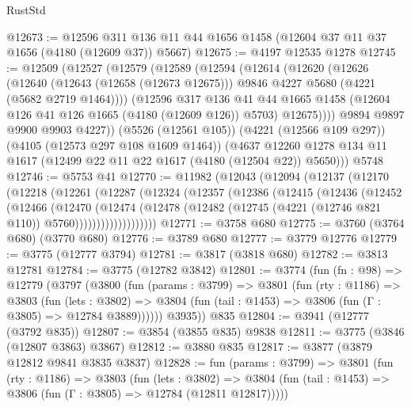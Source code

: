 \begin{lexlean}{RustStd}
\begin{coremodule}
@12673 := @12596 @311 @136 @11 @44 @1656 @1458 (@12604 @37 @11 @37 @1656 (@4180 (@12609 @37)) @5667)
@12675 := @4197 @12535 @1278
@12745 := @12509
    (@12527
      (@12579
        (@12589
          (@12594
            (@12614
              (@12620
                (@12626
                  (@12640
                    (@12643 (@12658 (@12673 @12675)))
                    @9846
                    @4227
                    @5680
                    (@4221 (@5682 @2719 @1464))))
                (@12596
                  @317
                  @136
                  @41
                  @44
                  @1665
                  @1458
                  (@12604 @126 @41 @126 @1665 (@4180 (@12609 @126)) @5703)
                  @12675))))
          @9894
          @9897
          @9900
          @9903
          @4227))
      (@5526 (@12561 @105))
      (@4221 (@12566 @109 @297))
      (@4105 (@12573 @297 @108 @1609 @1464))
      (@4637 @12260 @1278 @134 @11 @1617 (@12499 @22 @11 @22 @1617 (@4180 (@12504 @22)) @5650)))
    @5748
@12746 := @5753 @41
@12770 := @11982
    (@12043
      (@12094
        (@12137
          (@12170
            (@12218
              (@12261
                (@12287
                  (@12324
                    (@12357
                      (@12386
                        (@12415
                          (@12436
                            (@12452
                              (@12466
                                (@12470
                                  (@12474
                                    (@12478
                                      (@12482
                                        (@12745 (@4221 (@12746 @821 @110)) @5760)))))))))))))))))))
@12771 := @3758 @680
@12775 := @3760 (@3764 @680) (@3770 @680)
@12776 := @3789 @680
@12777 := @3779 @12776
@12779 := @3775 (@12777 @3794)
@12781 := @3817 (@3818 @680)
@12782 := @3813 @12781
@12784 := @3775 (@12782 @3842)
@12801 := @3774
    (fun (fn : @98) =>
    @12779
      (@3797
        (@3800
          (fun (params : @3799) =>
          @3801
            (fun (rty : @1186) =>
            @3803
              (fun (lets : @3802) =>
              @3804 (fun (tail : @1453) => @3806 (fun (Γ : @3805) => @12784 @3889))))))
        @3935))
    @835
@12804 := @3941 (@12777 (@3792 @835))
@12807 := @3854 (@3855 @835) @9838
@12811 := @3775 (@3846 (@12807 @3863) @3867)
@12812 := @3880 @835
@12817 := @3877 (@3879 @12812 @9841 @3835 @3837)
@12828 := fun (params : @3799) =>
  @3801
    (fun (rty : @1186) =>
    @3803
      (fun (lets : @3802) =>
      @3804 (fun (tail : @1453) => @3806 (fun (Γ : @3805) => @12784 (@12811 @12817)))))

\end{coremodule}
\end{lexlean}
